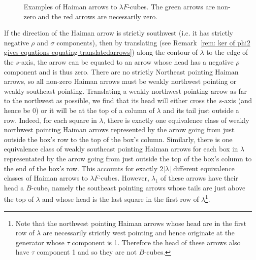 \documentclass{amsart}
\theoremstyle{definition}
\begin{document}
\begin{figure}
\caption{Examples of Haiman arrows to $\lambda F$-cubes. The green
arrows are non-zero and the red arrows are necessarily zero.}\label{fig: Haiman arrows
to F-cubes}
\end{figure}

If the direction of the Haiman arrow is strictly southwest (i.e. it
has strictly negative $\rho$ and $\sigma$ components), then by
translating (see Remark~\ref{rem: ker of phi2 gives equations equating
translatedarrows}) along the contour of $\lambda$ to the edge of the
$s$-axis, the arrow can be equated to an arrow whose head has a
negative $\rho$ component and is thus zero. There are no strictly
Northeast pointing Haiman arrows, so all non-zero Haiman arrows must
be weakly northwest pointing or weakly southeast pointing. Translating
a weakly northwest pointing arrow as far to the northwest as possible,
we find that its head will either cross the $s$-axis (and hence be 0)
or it will be at the top of a column of $\lambda$ and its tail just
outside a row. Indeed, for each square in $\lambda $, there is exactly
one equivalence class of weakly northwest pointing Haiman arrows
represented by the arrow going from just outside the box's row to the
top of the box's column. Similarly, there is one equivalence class of
weakly southeast pointing Haiman arrows for each box in $\lambda$
representated by the arrow going from just outside the top of the
box's column to the end of the box's row. This accounts for exactly
$2|\lambda |$ different equivalence classes of Haiman arrows to
$\lambda F$-cubes. However, $\lambda_{1}$ of these arrows have their
head a $B$-cube, namely the southeast pointing arrows whose tails are
just above the top of $\lambda$ and whose head is the last square in
the first row of $\lambda$\footnote{Note that the northwest pointing
Haiman arrows whose head are in the first row of $\lambda$ are
necessarily strictly west pointing and hence originate at the
generator whose $\tau$ component is 1. Therefore the head of these
arrows also have $\tau$ component 1 and so they are not $B$-cubes.}.
\end{document}
